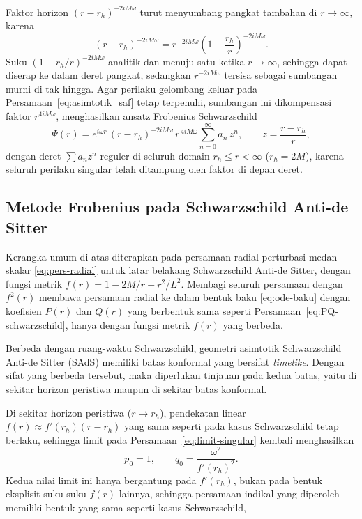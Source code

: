 Faktor horizon $(r-r_h)^{-2iM\omega}$ turut menyumbang pangkat tambahan di $r \to \infty$,
karena
\begin{equation}
    (r-r_h)^{-2iM\omega} = r^{-2iM\omega}\left(1-\frac{r_h}{r}\right)^{-2iM\omega}.
    \label{eq:ekspansi-horizon-tak-hingga}
\end{equation}
Suku $(1-r_h/r)^{-2iM\omega}$ analitik dan menuju satu ketika $r\to\infty$, sehingga dapat
diserap ke dalam deret pangkat, sedangkan $r^{-2iM\omega}$ tersisa sebagai sumbangan murni di
tak hingga. Agar perilaku gelombang keluar pada Persamaan~\eqref{eq:asimtotik_saf} tetap
terpenuhi, sumbangan ini dikompensasi faktor $r^{4iM\omega}$, menghasilkan ansatz Frobenius
Schwarzschild
\begin{equation}
    \Psi(r) = e^{i\omega r}\,(r - r_h)^{-2iM\omega}\, r^{\,4iM\omega} \sum_{n=0}^{\infty} a_n\, z^n,
    \qquad z = \frac{r - r_h}{r},
    \label{eq:ansatz_saf}
\end{equation}
dengan deret $\sum a_n z^n$ reguler di seluruh domain $r_h \le r < \infty$ ($r_h = 2M$),
karena seluruh perilaku singular telah ditampung oleh faktor di depan deret.

\subsection{Metode Frobenius pada Schwarzschild Anti-de Sitter}
\label{subsec:frobenius-sads}

\noindent Kerangka umum di atas diterapkan pada persamaan radial perturbasi medan skalar
\eqref{eq:pers-radial} untuk latar belakang Schwarzschild Anti-de Sitter, dengan fungsi
metrik $f(r) = 1 - 2M/r + r^2/L^2$. Membagi seluruh persamaan dengan $f^2(r)$ membawa
persamaan radial ke dalam bentuk baku \eqref{eq:ode-baku} dengan koefisien $P(r)$ dan $Q(r)$
yang berbentuk sama seperti Persamaan~\eqref{eq:PQ-schwarzschild}, hanya dengan fungsi
metrik $f(r)$ yang berbeda.

Berbeda dengan ruang-waktu Schwarzschild, geometri asimtotik Schwarzschild Anti-de Sitter
(SAdS) memiliki batas konformal yang bersifat \textit{timelike}. Dengan sifat yang berbeda
tersebut, maka diperlukan tinjauan pada kedua batas, yaitu di sekitar horizon peristiwa
maupun di sekitar batas konformal.

Di sekitar horizon peristiwa ($r\rightarrow r_h$), pendekatan linear
$f(r) \approx f'(r_h)(r-r_h)$ yang sama seperti pada kasus Schwarzschild tetap berlaku,
sehingga limit pada Persamaan~\eqref{eq:limit-singular} kembali menghasilkan
\begin{equation}
    p_0 = 1, \qquad q_0 = \frac{\omega^2}{f'(r_h)^2}.
\end{equation}
Kedua nilai limit ini hanya bergantung pada $f'(r_h)$, bukan pada
bentuk eksplisit suku-suku $f(r)$ lainnya, sehingga persamaan indikal yang diperoleh
memiliki bentuk yang sama seperti kasus Schwarzschild,

